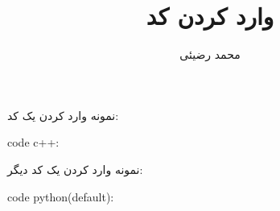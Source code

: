 \documentclass[12pt]{article}
\title{وارد کردن کد}
\author{محمد رضیئی}
\begin{document}
\maketitle

	نمونه وارد کردن یک کد:
\begin{latin}
\noindent code c++:

\end{latin}	


نمونه وارد کردن یک کد دیگر:
\begin{latin}
\noindent code python(default):

\end{latin}
\end{document}
